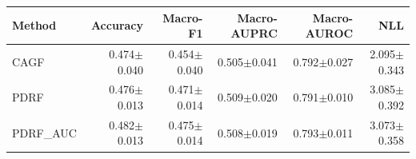 \begin{tabular}{lrrrrr}
\toprule
Method & Accuracy & Macro-F1 & Macro-AUPRC & Macro-AUROC & NLL\\
\midrule
CAGF & 0.474$\pm$0.040 & 0.454$\pm$0.040 & 0.505$\pm$0.041 & 0.792$\pm$0.027 & 2.095$\pm$0.343\\
PDRF & 0.476$\pm$0.013 & 0.471$\pm$0.014 & 0.509$\pm$0.020 & 0.791$\pm$0.010 & 3.085$\pm$0.392\\
PDRF\_AUC & 0.482$\pm$0.013 & 0.475$\pm$0.014 & 0.508$\pm$0.019 & 0.793$\pm$0.011 & 3.073$\pm$0.358\\
\bottomrule
\end{tabular}

